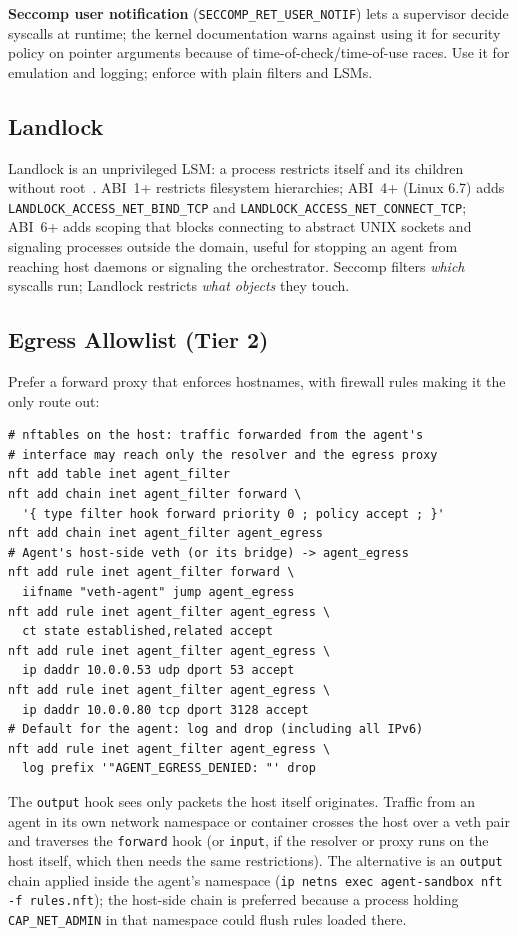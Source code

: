 \documentclass[11pt,letterpaper]{article}
\begin{document}
\textbf{Seccomp user notification} (\texttt{SECCOMP\_RET\_USER\_NOTIF}) lets a supervisor decide syscalls at runtime; the kernel documentation warns against using it for security policy on pointer arguments because of time-of-check/time-of-use races. Use it for emulation and logging; enforce with plain filters and LSMs.

\subsection{Landlock}

Landlock is an unprivileged LSM: a process restricts itself and its children without root~\cite{landlock}. ABI~1+ restricts filesystem hierarchies; ABI~4+ (Linux 6.7) adds \texttt{LANDLOCK\_ACCESS\_NET\_BIND\_TCP} and \texttt{LANDLOCK\_ACCESS\_NET\_CONNECT\_TCP}; ABI~6+ adds scoping that blocks connecting to abstract UNIX sockets and signaling processes outside the domain, useful for stopping an agent from reaching host daemons or signaling the orchestrator. Seccomp filters \emph{which} syscalls run; Landlock restricts \emph{what objects} they touch.

\subsection{Egress Allowlist (Tier 2)}

Prefer a forward proxy that enforces hostnames, with firewall rules making it the only route out:
\begin{lstlisting}[style=shell]
# nftables on the host: traffic forwarded from the agent's
# interface may reach only the resolver and the egress proxy
nft add table inet agent_filter
nft add chain inet agent_filter forward \
  '{ type filter hook forward priority 0 ; policy accept ; }'
nft add chain inet agent_filter agent_egress
# Agent's host-side veth (or its bridge) -> agent_egress
nft add rule inet agent_filter forward \
  iifname "veth-agent" jump agent_egress
nft add rule inet agent_filter agent_egress \
  ct state established,related accept
nft add rule inet agent_filter agent_egress \
  ip daddr 10.0.0.53 udp dport 53 accept
nft add rule inet agent_filter agent_egress \
  ip daddr 10.0.0.80 tcp dport 3128 accept
# Default for the agent: log and drop (including all IPv6)
nft add rule inet agent_filter agent_egress \
  log prefix '"AGENT_EGRESS_DENIED: "' drop
\end{lstlisting}

The \texttt{output} hook sees only packets the host itself originates. Traffic from an agent in its own network namespace or container crosses the host over a veth pair and traverses the \texttt{forward} hook (or \texttt{input}, if the resolver or proxy runs on the host itself, which then needs the same restrictions). The alternative is an \texttt{output} chain applied inside the agent's namespace (\texttt{ip netns exec agent-sandbox nft -f rules.nft}); the host-side chain is preferred because a process holding \texttt{CAP\_NET\_ADMIN} in that namespace could flush rules loaded there.
\end{document}
